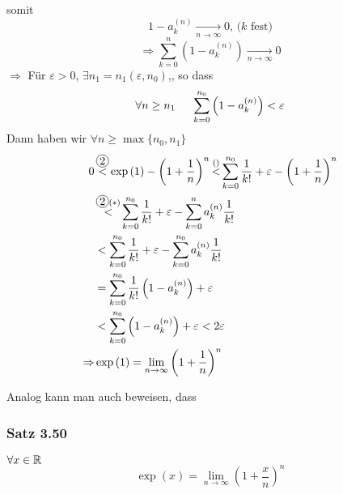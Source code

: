 \begin{beweis}{}
\begin{enumerate}
somit
\[ 1-a_k^{(n)}\mathop  \to \limits_{n \to \infty } 0\text{, ($k$ fest)}\]
\[\Rightarrow\sum\limits_{k = 0}^n {\left( {1 - a_k^{(n)}} \right)} \mathop  \to \limits_{n \to \infty } 0\]
$\Rightarrow$ Für $\varepsilon>0$, $\exists n_1=n_1(\varepsilon,n_0)$,, so dass
\[\forall n \ge {n_1}\hspace{5mm}\sum\limits_{k = 0}^{{n_0}} {\left( {1 - a_k^{(n)}} \right)}  < \varepsilon \]
Dann haben wir $\forall n \ge \max \{ {n_0},{n_1}\} $
\begin{align*}
0&\mathop  < \limits^{\mycirc{2}} \exp \left( 1 \right) - {\left( {1 + \frac{1}{n}} \right)^n}\mathop  < \limits^{()} \sum\limits_{k = 0}^{{n_0}} {\frac{1}{{k!}}}  + \varepsilon  - {\left( {1 + \frac{1}{n}} \right)^n}\\
&\mathop  < \limits^{\mycirc{2}(\text{\textasteriskcentered})} \sum\limits_{k = 0}^{{n_0}} {\frac{1}{{k!}}}  + \varepsilon  - \sum\limits_{k = 0}^n {a_k^{(n)}} \frac{1}{{k!}}\\
 &< \sum\limits_{k = 0}^{{n_0}} {\frac{1}{{k!}}}  + \varepsilon  - \sum\limits_{k = 0}^{{n_0}} {a_k^{(n)}} \frac{1}{{k!}}\\
 &= \sum\limits_{k = 0}^{{n_0}} {\frac{1}{{k!}}} \left( {1 - a_k^{(n)}} \right) + \varepsilon \\
& < \sum\limits_{k = 0}^{{n_0}} {\left( {1 - a_k^{(n)}} \right)}  + \varepsilon  < 2\varepsilon \\
 \Rightarrow&\exp \left( 1 \right) = \mathop {\lim }\limits_{n \to \infty } {\left( {1 + \frac{1}{n}} \right)^n}
\end{align*}
\end{enumerate}
\end{beweis}

Analog kann man auch beweisen, dass
\subsubsection*{Satz 3.50}
$\forall x\in\mathbb{R}$
\[\exp(x)=\mathop {\lim }\limits_{n \to \infty } {\left( {1 + \frac{x}{n}} \right)^n}\]
